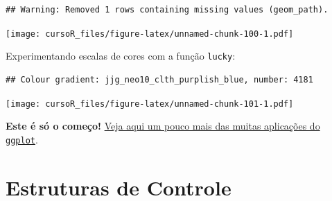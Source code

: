 \documentclass[]{book}
\newenvironment{Shaded}{\begin{snugshade}}{\end{snugshade}}
\newcommand{\KeywordTok}[1]{\textcolor[rgb]{0.13,0.29,0.53}{\textbf{#1}}}
\newcommand{\DataTypeTok}[1]{\textcolor[rgb]{0.13,0.29,0.53}{#1}}
\newcommand{\StringTok}[1]{\textcolor[rgb]{0.31,0.60,0.02}{#1}}
\newcommand{\CommentTok}[1]{\textcolor[rgb]{0.56,0.35,0.01}{\textit{#1}}}
\newcommand{\OperatorTok}[1]{\textcolor[rgb]{0.81,0.36,0.00}{\textbf{#1}}}
\newcommand{\NormalTok}[1]{#1}
\theoremstyle{definition}
\theoremstyle{definition}
\theoremstyle{definition}
\theoremstyle{remark}
\begin{document}
\begin{verbatim}
## Warning: Removed 1 rows containing missing values (geom_path).
\end{verbatim}

\texttt{[image: cursoR\_files/figure-latex/unnamed-chunk-100-1.pdf]}

Experimentando escalas de cores com a função \texttt{lucky}:

\begin{Shaded}
\end{Shaded}

\begin{verbatim}
## Colour gradient: jjg_neo10_clth_purplish_blue, number: 4181
\end{verbatim}

\texttt{[image: cursoR\_files/figure-latex/unnamed-chunk-101-1.pdf]}

\textbf{Este é só o começo!}
\href{http://r-statistics.co/Top50-Ggplot2-Visualizations-MasterList-R-Code.html}{Veja
aqui um pouco mais das muitas aplicações do \texttt{ggplot}}.

\chapter{Estruturas de Controle}\label{loop}
\end{document}
